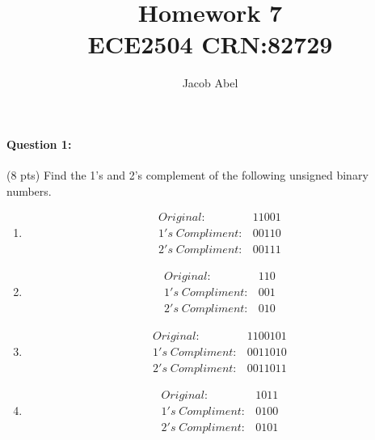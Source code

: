 \documentclass[12pt,letterpaper,titlepage]{report}
\author{Jacob Abel}
\title{%
	Homework 7
	\\\large ECE2504 CRN:82729
}
\begin{document}
\maketitle
\begin{raggedright}
\raggedcolumns
\paragraph{Question 1:}
(8 pts) Find the 1’s and 2’s complement of the following unsigned binary numbers.
\begin{multicols}{2}
\begin{enumerate} [label=\alph*)]
\item \begin{align*}
       Original:& 11001\\
1's\;Compliment:& 00110\\
2's\;Compliment:& 00111
\end{align*}
\item \begin{align*}
       Original:& 110\\
1's\;Compliment:& 001\\
2's\;Compliment:& 010
\end{align*}
\item \begin{align*}
       Original:& 1100101\\
1's\;Compliment:& 0011010\\
2's\;Compliment:& 0011011
\end{align*}
\item \begin{align*}
       Original:& 1011\\
1's\;Compliment:& 0100\\
2's\;Compliment:& 0101
\end{align*}
\end{enumerate}
\end{multicols}


\end{raggedright}
\end{document}
